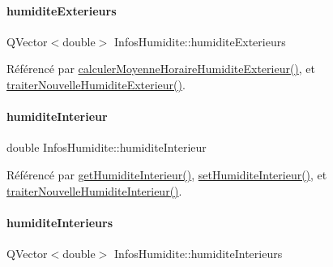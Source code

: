 \paragraph{\texorpdfstring{humidite\+Exterieurs}{humiditeExterieurs}}
{\footnotesize\ttfamily Q\+Vector$<$double$>$ Infos\+Humidite\+::humidite\+Exterieurs\hspace{0.3cm}{\ttfamily [private]}}



Référencé par \hyperlink{class_infos_humidite_afc4f6ba3cd4664118ef40f4c12b76506}{calculer\+Moyenne\+Horaire\+Humidite\+Exterieur()}, et \hyperlink{class_infos_humidite_a8d17fa3c7d15b1ff8130ae5d22702e5f}{traiter\+Nouvelle\+Humidite\+Exterieur()}.

\mbox{\label{class_infos_humidite_ad2847e671ad0b90f8dc0940dee107c38}} 
\paragraph{\texorpdfstring{humidite\+Interieur}{humiditeInterieur}}
{\footnotesize\ttfamily double Infos\+Humidite\+::humidite\+Interieur\hspace{0.3cm}{\ttfamily [private]}}



Référencé par \hyperlink{class_infos_humidite_a652f7ca3e4b97352034fed62c6d865b7}{get\+Humidite\+Interieur()}, \hyperlink{class_infos_humidite_a238c8b3bd6b09c4f770058a05468baa8}{set\+Humidite\+Interieur()}, et \hyperlink{class_infos_humidite_a0995d68a036f73df3b5a86e5538104bd}{traiter\+Nouvelle\+Humidite\+Interieur()}.

\mbox{\label{class_infos_humidite_a2bcd5b3629a007078d4e15d110dae457}} 
\paragraph{\texorpdfstring{humidite\+Interieurs}{humiditeInterieurs}}
{\footnotesize\ttfamily Q\+Vector$<$double$>$ Infos\+Humidite\+::humidite\+Interieurs\hspace{0.3cm}{\ttfamily [private]}}



